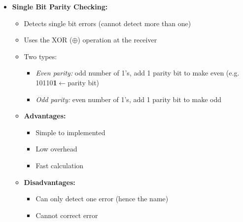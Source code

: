 \documentclass{article}
\begin{document}
\begin{itemize}
    \item \textbf{Single Bit Parity Checking:}
    \begin{itemize}
        \item Detects single bit errors (cannot detect more than one)
        \item Uses the XOR ($\oplus$) operation at the receiver
        \item Two types:
        \begin{itemize}
            \item \textit{Even parity:} odd number of 1's, add 1 parity bit to make even 
            (e.g. 10110\textbf{1}$\leftarrow$parity bit)
            \item \textit{Odd parity:} even number of 1's, add 1 parity bit to make odd
        \end{itemize}
        \item \textbf{Advantages:}
        \begin{itemize}
            \item Simple to implemented
            \item Low overhead
            \item Fast calculation
        \end{itemize}
        \item \textbf{Disadvantages:}
        \begin{itemize}
            \item Can only detect one error (hence the name)
            \item Cannot correct error
        \end{itemize}
    \end{itemize}


\end{itemize}
\end{document}
